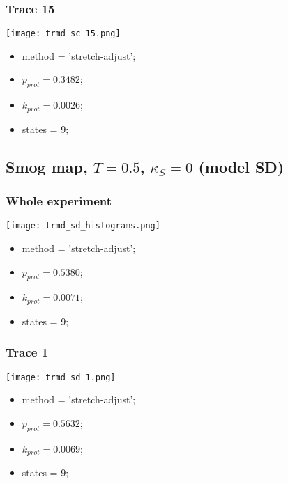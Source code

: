 \subsubsection{Trace 15}
\begin{minipage}[c]{0.7\textwidth}
    \texttt{[image: trmd\_sc\_15.png]}
\end{minipage}
\hfill
\begin{minipage}[c]{0.45\textwidth}
    \begin{itemize}
        \item method = 'stretch-adjust';
        \item $p_{prot}=0.3482$;
        \item $k_{prot}=0.0026$;
        \item states = 9;
    \end{itemize}
\end{minipage}


\subsection{Smog map, $T=0.5$, $\kappa_S=0$ (model SD)}
\subsubsection{Whole experiment}
\begin{minipage}[c]{0.7\textwidth}
    \texttt{[image: trmd\_sd\_histograms.png]}
\end{minipage}
\hfill
\begin{minipage}[c]{0.45\textwidth}
    \begin{itemize}
        \item method = 'stretch-adjust';
        \item $p_{prot}=0.5380$;
        \item $k_{prot}=0.0071$;
        \item states = 9;
    \end{itemize}
\end{minipage}

\subsubsection{Trace 1}
\begin{minipage}[c]{0.7\textwidth}
    \texttt{[image: trmd\_sd\_1.png]}
\end{minipage}
\hfill
\begin{minipage}[c]{0.45\textwidth}
    \begin{itemize}
        \item method = 'stretch-adjust';
        \item $p_{prot}=0.5632$;
        \item $k_{prot}=0.0069$;
        \item states = 9;
    \end{itemize}
\end{minipage}

